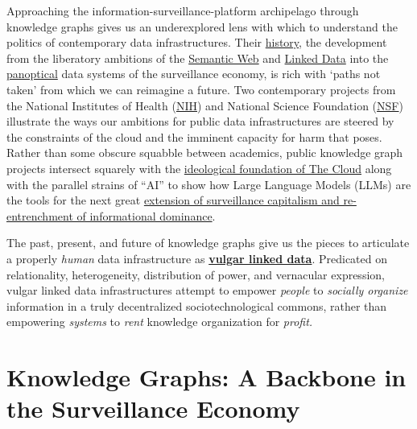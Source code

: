 Approaching the information-surveillance-platform archipelago through
knowledge graphs gives us an underexplored lens with which to understand
the politics of contemporary data infrastructures. Their
\protect\hyperlink{knowledge-graphs-a-backbone-in-the-surveillance-economy}{history},
the development from the liberatory ambitions of the
\protect\hyperlink{semantic-web-priesthoods}{Semantic Web} and
\protect\hyperlink{linked-data-platforms}{Linked Data} into the
\protect\hyperlink{knowledge-graphs-panoptica}{panoptical} data systems
of the surveillance economy, is rich with `paths not taken' from which
we can reimagine a future. Two contemporary projects from the National
Institutes of Health
(\protect\hyperlink{nih-the-biomedical-translator}{NIH}) and National
Science Foundation (\protect\hyperlink{nsf-open-knowledge-network}{NSF})
illustrate the ways our ambitions for public data infrastructures are
steered by the constraints of the cloud and the imminent capacity for
harm that poses. Rather than some obscure squabble between academics,
public knowledge graph projects intersect squarely with the
\protect\hyperlink{the-cloud-orthodoxy}{ideological foundation of The
Cloud} along with the parallel strains of ``AI'' to show how Large
Language Models (LLMs) are the tools for the next great
\protect\hyperlink{the-near-future-of-surveillance-capitalism-knowledge-graphs-get-chatbots.}{extension
of surveillance capitalism and re-entrenchment of informational
dominance}.

The past, present, and future of knowledge graphs give us the pieces to
articulate a properly \emph{human} data infrastructure as
\protect\hyperlink{vulgar-linked-data}{\textbf{vulgar linked data}}.
Predicated on relationality, heterogeneity, distribution of power, and
vernacular expression, vulgar linked data infrastructures attempt to
empower \emph{people} to \emph{socially organize} information in a truly
decentralized sociotechnological commons, rather than empowering
\emph{systems} to \emph{rent} knowledge organization for \emph{profit.}

\hypertarget{knowledge-graphs-a-backbone-in-the-surveillance-economy}{%
\section{Knowledge Graphs: A Backbone in the Surveillance
Economy}\label{knowledge-graphs-a-backbone-in-the-surveillance-economy}}

